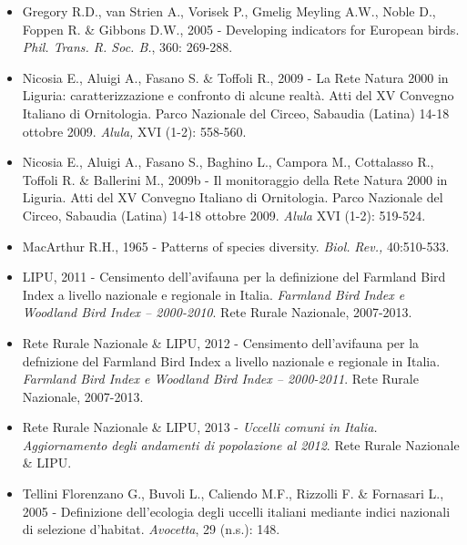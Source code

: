 \begin{itemize}
	\item Gregory R.D., van Strien A., Vorisek P., Gmelig Meyling A.W., Noble D.,
Foppen R. \& Gibbons D.W., 2005 - Developing indicators for European
birds. \textit{Phil. Trans. R. Soc. B.}, 360: 269-288.

	\item Nicosia E., Aluigi A., Fasano S. \& Toffoli R., 2009 - La Rete Natura
2000 in Liguria: caratterizzazione e con\allowbreak fronto di alcune realt\`a.
Atti del XV Convegno Italiano di Ornitologia. Parco Nazionale del
Circeo, Sabaudia (Latina) 14-18 ottobre 2009. \textit{Alula,} XVI
(1-2): 558-560.

	\item Nicosia E.,  Aluigi A., Fasano S., Baghino L., Campora M., Cottalasso
R., Toffoli R. \& Ballerini M., 2009b - Il monitoraggio della Rete
Natura 2000 in Liguria. Atti del XV Convegno Italiano di Ornitologia.
Parco Nazionale del Circeo, Sabaudia (Latina) 14-18 ottobre 2009.
\textit{Alula} XVI (1-2): 519-524. 

	\item MacArthur R.H., 1965 - Patterns of species diversity. \textit{Biol.
}\textit{Rev., }40:510-533. 

	\item LIPU, 2011 - Censimento dell{\textquoteright}avifauna per la
definizione del Farmland Bird Index a livello na\allowbreak zionale e
regionale in Italia. \textit{Farmland Bird Index e Woodland Bird Index
-- 2000-2010}. Rete Rurale Nazionale, 2007-2013. 

	\item Rete Rurale Nazionale \& LIPU, 2012 - Censimento
dell{\textquoteright}avifauna per la defnizione del Farmland Bird
Index a livello na\allowbreak zionale e regionale in Italia. \textit{Farmland
Bird Index e Woodland Bird Index -- 2000-2011}. Rete Rurale Nazionale,
2007-2013.

	\item Rete Rurale Nazionale \& LIPU, 2013 - \textit{Uccelli comuni in Italia.
Aggiornamento degli andamenti di popolazione al 2012}. Rete Rurale
Nazionale \& LIPU.

	\item Tellini Florenzano G., Buvoli L., Caliendo M.F., Rizzolli F. \&
Fornasari L., 2005 - Definizione dell{\textquoteright}ecologia
degli uccelli italiani mediante indici nazionali di selezione
d{\textquoteright}habitat. \textit{Avocetta}, 29 (n.s.): 148.
\end{itemize}
